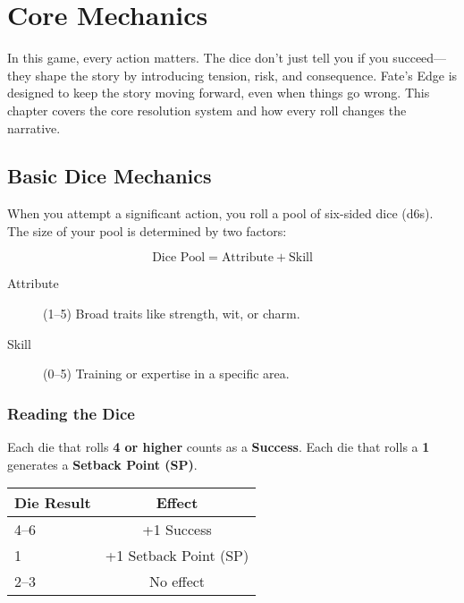 
\chapter{Core Mechanics} \label{ch:core-mechanics}

\begin{multicols}{2}

In this game, every action matters. The dice don't just tell you if you succeed—they shape the story by introducing tension, risk, and consequence. Fate’s Edge is designed to keep the story moving forward, even when things go wrong. This chapter covers the core resolution system and how every roll changes the narrative.

\section{Basic Dice Mechanics} 

When you attempt a significant action, you roll a pool of six-sided dice (d6s). The size of your pool is determined by two factors:

\[
\text{Dice Pool} = \text{Attribute} + \text{Skill}
\]

\begin{description}
  \item[Attribute] (1–5) Broad traits like strength, wit, or charm. 
  \item[Skill] (0–5) Training or expertise in a specific area. 
\end{description}

\subsection*{Reading the Dice}

Each die that rolls \textbf{4 or higher} counts as a \textbf{Success}.  
Each die that rolls a \textbf{1} generates a \textbf{Setback Point (SP)}.

\begin{center}
\small
\begin{tabular}{lc}
\toprule
\textbf{Die Result} & \textbf{Effect} \\
\midrule
4--6 & +1 Success \\
1 & +1 Setback Point (SP) \\
2--3 & No effect \\
\bottomrule
\end{tabular}
\end{center}


\end{multicols}
